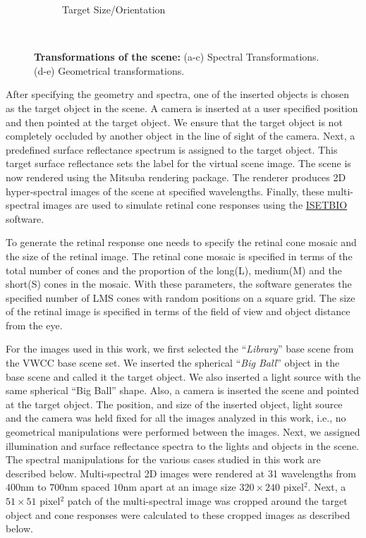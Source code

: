 \documentclass{jov}
\begin{document}
\begin{figure}
\begin{subfigure}[b]{0.18 \textwidth}
        \caption{Target Size/Orientation}
        \label{fig:targetSizeOrientation}
    \end{subfigure}
    ~ %
    \caption{{\bf Transformations of the scene:} (a-c) Spectral Transformations. (d-e) Geometrical transformations.}\label{fig:spectralTransformations}
\end{figure}

After specifying the geometry and spectra, one of the inserted objects is chosen as the target object in the scene. A camera is inserted at a user specified position and then pointed at the target object. We ensure that the target object is not completely occluded by another object in the line of sight of the camera. Next, a predefined surface reflectance spectrum is assigned to the target object. This target surface reflectance sets the label for the virtual scene image. The scene is now rendered using the Mitsuba rendering package. The renderer produces 2D hyper-spectral images of the scene at specified wavelengths. Finally, these multi-spectral images are used to simulate retinal cone responses using the \href{https://github.com/isetbio}{ISETBIO} software.

To generate the retinal response one needs to specify the retinal cone mosaic and the size of the retinal image. The retinal cone mosaic is specified in terms of the total number of cones and the proportion of the long(L), medium(M) and the short(S) cones in the mosaic. With these parameters, the software generates the specified number of LMS cones with random positions on a square grid. The size of the retinal image is specified in terms of the field of view and object distance from the eye. 

For the images used in this work, we first selected the ``{\it Library}'' base scene from the VWCC base scene set. We inserted the spherical ``{\it Big Ball}'' object in the base scene and called it the target object. We also inserted a light source with the same spherical ``Big Ball'' shape. Also, a camera is inserted the scene and pointed at the target object. The position, and size of the inserted object, light source and the camera was held fixed for all the images analyzed in this work, i.e., no geometrical manipulations were performed between the images. Next, we assigned illumination and surface reflectance spectra to the lights and objects in the scene. The spectral manipulations for the various cases studied in this work are described below. Multi-spectral 2D images were rendered at 31 wavelengths from $400$nm to $700$nm spaced $10$nm apart at an image size $320\times 240$ pixel$^2$. Next, a $51 \times 51$ pixel$^2$ patch of the multi-spectral image was cropped around the target object and cone responses were calculated to these cropped images as described below.
\end{document}
